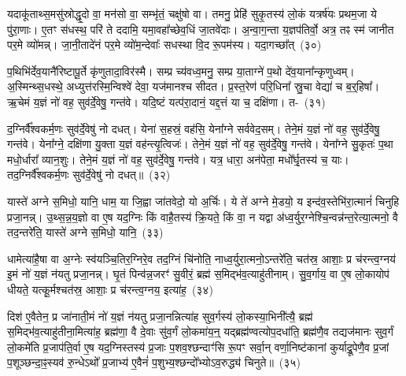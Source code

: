यदाकू॑ताथ्स॒मसु॑स्रोद्धृ॒दो वा॒ मन॑सो वा॒ सम्भृ॑तं॒ चक्षु॑षो वा। तमनु॒ प्रेहि॑ सुकृ॒तस्य॑ लो॒कं यत्रर्\mbox{}ष॑यः प्रथम॒जा ये पु॑रा॒णाः। ए॒तꣳ स॑धस्थ॒ परि॑ ते ददामि॒ यमा॒वहा᳚च्छेव॒धिं जा॒तवे॑दाः। अ॒न्वा॒ग॒न्ता य॒ज्ञप॑तिर्वो॒ अत्र॒ तꣴ स्म॑ जानीत पर॒मे व्यो॑मन्न्। जा॒नी॒तादे॑नं पर॒मे व्यो॑म॒न्देवाः᳚ सधस्था वि॒द रू॒पम॑स्य। यदा॒गच्छा᳚त्~(३०)\ip

प॒थिभि॑र्देव॒यानै॑रिष्टापू॒र्ते कृ॑णुतादा॒विर॑स्मै। सम्प्र च्य॑वध्व॒मनु॒ सम्प्र या॒ताग्ने॑ प॒थो दे॑व॒याना᳚न्कृणुध्वम्। अ॒स्मिन्थ्स॒धस्थे॒ अध्युत्त॑रस्मि॒न्विश्वे॑ देवा॒ यज॑मानश्च सीदत। प्र॒स्त॒रेण॑ परि॒धिना᳚ स्रु॒चा वेद्या॑ च ब॒र्॒\mbox{}हिषा᳚। ऋ॒चेमं य॒ज्ञं नो॑ वह॒ सुव॑र्दे॒वेषु॒ गन्त॑वे। यदि॒ष्टं यत्प॑रा॒दानं॒ यद्द॒त्तं या च॒ दक्षि॑णा। त-~(३१)\ip

द॒ग्निर्वै᳚श्वकर्म॒णः सुव॑र्दे॒वेषु॑ नो दधत्। येना॑ स॒हस्रं॒ वह॑सि॒ येना᳚ग्ने सर्ववेद॒सम्। तेने॒मं य॒ज्ञं नो॑ वह॒ सुव॑र्दे॒वेषु॒ गन्त॑वे। येना᳚ग्ने॒ दक्षि॑णा यु॒क्ता य॒ज्ञं वह॑न्त्यृ॒त्विजः॑। तेने॒मं य॒ज्ञं नो॑ वह॒ सुव॑र्दे॒वेषु॒ गन्त॑वे। येना᳚ग्ने सु॒कृतः॑ प॒था मधो॒र्धारा᳚ व्यान॒शुः। तेने॒मं य॒ज्ञं नो॑ वह॒ सुव॑र्दे॒वेषु॒ गन्त॑वे। यत्र॒ धारा॒ अन॑पेता॒ मधो᳚र्घृ॒तस्य॑ च॒ याः। तद॒ग्निर्वै᳚श्वकर्म॒णः सुव॑र्दे॒वेषु॑ नो दधत्॥~(३२)\ip

{\anuvakamend[{आ॒गच्छा॒त्तद्व्या॑न॒शुस्तेने॒मं य॒ज्ञं नो॑ वह॒ सुव॑र्दे॒वेषु॒ गन्त॑वे॒ चतु॑र्दश च}]}

यास्ते॑ अग्ने स॒मिधो॒ यानि॒ धाम॒ या जि॒ह्वा जा॑तवेदो॒ यो अ॒र्चिः। ये ते॑ अग्ने मे॒डयो॒ य इन्द॑व॒स्तेभि॑रा॒त्मानं॑ चिनुहि प्रजा॒नन्न्। उ॒थ्स॒न्न॒य॒ज्ञो वा ए॒ष यद॒ग्निः किं वाहै॒तस्य॑ क्रि॒यते॒ किं वा॒ न यद्वा अ॑ध्व॒र्युर॒ग्नेश्चि॒न्वन्न॑न्त॒रेत्या॒त्मनो॒ वै तद॒न्तरे॑ति॒ यास्ते॑ अग्ने स॒मिधो॒ यानि॒~(३३)\ip

धामेत्या॑है॒षा वा अ॒ग्नेः स्व॑यञ्चि॒तिर॒ग्निरे॒व तद॒ग्निं चि॑नोति॒ नाध्व॒र्युरा॒त्मनो॒\-ऽन्तरे॑ति॒ चत॑स्र॒ आशाः॒ प्र च॑रन्त्व॒ग्नय॑ इ॒मं नो॑ य॒ज्ञं न॑यतु प्रजा॒नन्न्। घृ॒तं पिन्व॑न्न॒जरꣳ॑ सु॒वीरं॒ ब्रह्म॑ स॒मिद्भ॑व॒त्याहु॑तीनाम्। सु॒व॒र्गाय॒ वा ए॒ष लो॒कायोप॑ धीयते॒ यत्कू॒र्मश्चत॑स्र॒ आशाः॒ प्र च॑रन्त्व॒ग्नय॒ इत्या॑ह॒~(३४)\ip

दिश॑ ए॒वैतेन॒ प्र जा॑नाती॒मं नो॑ य॒ज्ञं न॑यतु प्रजा॒नन्नित्या॑ह सुव॒र्गस्य॑ लो॒कस्या॒भिनी᳚त्यै॒ ब्रह्म॑ स॒मिद्भ॑व॒त्याहु॑तीना॒मित्या॑ह॒ ब्रह्म॑णा॒ वै दे॒वाः सु॑व॒र्गं लो॒कमा॑य॒न्॒ यद्ब्रह्म॑ण्वत्योप॒\-दधा॑ति॒ ब्रह्म॑णै॒व तद्यज॑मानः सुव॒र्गं लो॒कमे॑ति प्र॒जा\-प॑ति॒र्वा ए॒ष यद॒ग्निस्तस्य॑ प्र॒जाः प॒शव॒श्छन्दाꣳ॑सि रू॒पꣳ सर्वा॒न् वर्णा॒निष्ट॑कानां कुर्याद्रू॒पेणै॒व प्र॒जां प॒शूञ्छन्दा॒ꣴ॒स्यव॑ रु॒न्धे\-ऽथो᳚ प्र॒जाभ्य॑ ए॒वैनं॑ प॒शुभ्य॒श्छन्दो᳚भ्यो\-ऽव॒रुद्ध्य॑ चिनुते॥~(३५)\ip

